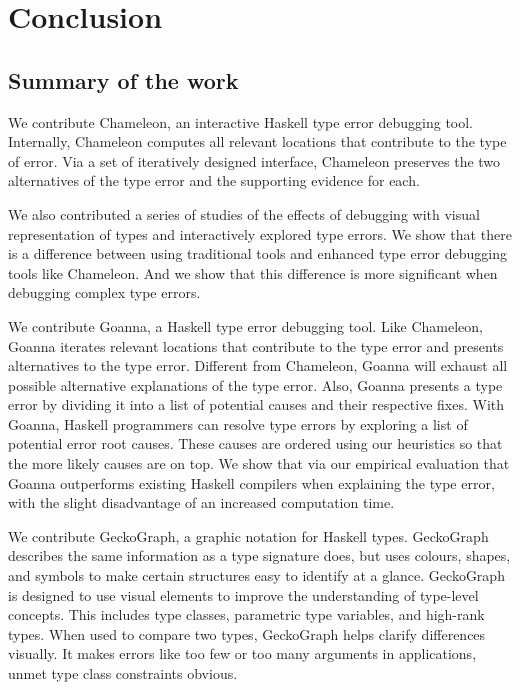 


\chapter{Conclusion}

\label{chap:conclusion} 
\graphicspath{{Figures/Conclusion}}

\section{Summary of the work}


We contribute Chameleon, an interactive Haskell type error debugging tool. Internally, Chameleon computes all relevant locations that contribute to the type of error. Via a set of iteratively designed interface, Chameleon preserves the two alternatives of the type error and the supporting evidence for each.


We also contributed a series of studies of the effects of debugging with visual representation of types and interactively explored type errors. We show that there is a difference between using traditional tools and enhanced type error debugging tools like Chameleon. And we show that this difference is more significant when debugging complex type errors.

 

We contribute Goanna, a Haskell type error debugging tool. Like Chameleon, Goanna iterates relevant locations that contribute to the type error and presents alternatives to the type error. Different from Chameleon, Goanna will exhaust all possible alternative explanations of the type error. Also, Goanna presents a type error by dividing it into a list of potential causes and their respective fixes. With Goanna, Haskell programmers can resolve type errors by exploring a list of potential error root causes. These causes are ordered using our heuristics so that the more likely causes are on top. We show that via our empirical evaluation that Goanna outperforms existing Haskell compilers when explaining the type error, with the slight disadvantage of an increased computation time.


We contribute GeckoGraph, a graphic notation for Haskell types. GeckoGraph describes the same information as a type signature does, but uses colours, shapes, and symbols to make certain structures easy to identify at a glance. GeckoGraph is designed to use visual elements to improve the understanding of type-level concepts. This includes type classes, parametric type variables, and high-rank types. When used to compare two types, GeckoGraph helps clarify differences visually. It makes errors like too few or too many arguments in applications, unmet type class constraints obvious.


